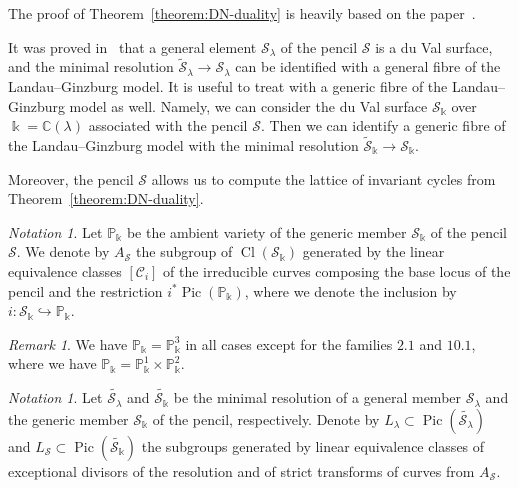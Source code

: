 \documentclass[10pt]{amsart}
\numberwithin{equation}{section}
\theoremstyle{plain}
\theoremstyle{definition}
\theoremstyle{remark}
\newtheorem{remark}[theorem]{Remark}
\newtheorem{notation}[theorem]{Notation}
\DeclareMathOperator{\Cl}{Cl}
\DeclareMathOperator{\Pic}{Pic}
\begin{document}
The proof of Theorem~\ref{theorem:DN-duality} is heavily based on the paper~\cite{cheltsov2018katzarkov}.

It was proved in~\cite[Lemma~1.5.3]{cheltsov2018katzarkov} that a general element \(\mathcal{S}_{\lambda}\) of the pencil \(\mathcal{S}\) is a du Val surface, and the minimal resolution \(\widetilde{\mathcal{S}}_{\lambda} \rightarrow \mathcal{S}_{\lambda}\) can be identified with a general fibre of the Landau--Ginzburg model. It is useful to treat with a generic fibre of the Landau--Ginzburg model as well. Namely, we can consider the du Val surface \(\mathcal{S}_{\Bbbk}\) over \(\Bbbk = \mathbb{C}(\lambda)\) associated with the pencil \(\mathcal{S}\). Then we can identify a generic fibre of the Landau--Ginzburg model with the minimal resolution \(\widetilde{\mathcal{S}}_{\Bbbk} \rightarrow \mathcal{S}_{\Bbbk}\).

Moreover, the pencil \(\mathcal{S}\) allows us to compute the lattice of invariant cycles from Theorem~\ref{theorem:DN-duality}.

\begin{notation}
  Let \(\mathbb{P}_{\Bbbk}\) be the ambient variety of the generic member \(\mathcal{S}_{\Bbbk}\) of the pencil \(\mathcal{S}\). We denote by \(A_{\mathcal{S}}\) the subgroup of \(\Cl(\mathcal{S}_{\Bbbk})\) generated by the linear equivalence classes \([\mathcal{C}_i]\) of the irreducible curves composing the base locus of the pencil and the restriction \(i^* \Pic(\mathbb{P}_{\Bbbk})\), where we denote the inclusion by \(i \colon \mathcal{S}_{\Bbbk} \hookrightarrow \mathbb{P}_{\Bbbk}\).
\end{notation}

\begin{remark}
  We have \(\mathbb{P}_{\Bbbk} = \mathbb{P}_{\Bbbk}^3\) in all cases except for the families \(2.1\) and \(10.1\), where we have \(\mathbb{P}_{\Bbbk} = \mathbb{P}_{\Bbbk}^1 \times \mathbb{P}_{\Bbbk}^2\).
\end{remark}

\begin{notation}
  Let \(\widetilde{\mathcal{S}_{\lambda}}\) and \(\widetilde{\mathcal{S}_{\Bbbk}}\) be the minimal resolution of a general member \(\mathcal{S}_{\lambda}\) and the generic member \(\mathcal{S}_{\Bbbk}\) of the pencil, respectively. Denote by \(L_{\lambda} \subset \Pic(\widetilde{\mathcal{S}_{\lambda}})\) and \(L_{\mathcal{S}} \subset \Pic(\widetilde{\mathcal{S}_{\Bbbk}})\) the subgroups generated by linear equivalence classes of exceptional divisors of the resolution and of strict transforms of curves from \(A_{\mathcal{S}}\).
\end{notation}
\end{document}

